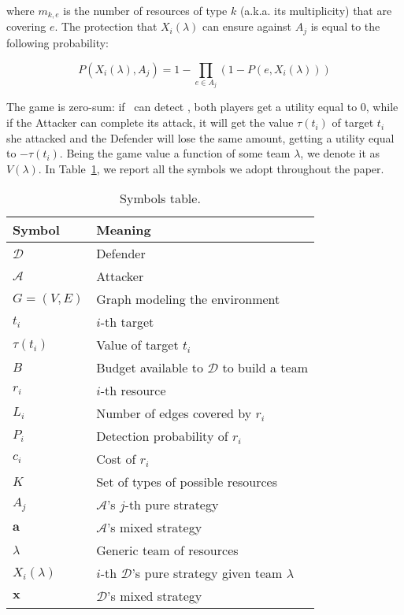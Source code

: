 where $m_{k,e}$ is the number of resources of type $k$ (a.k.a. its multiplicity) that are covering $e$. The protection that $X_i(\lambda)$ can ensure against $A_j$ is equal to the following probability:

\begin{equation*}
P(X_i(\lambda),A_j) = 1 - \prod_{e \in A_j}(1-P(e,X_i(\lambda)))
\end{equation*}

The game is zero-sum: if \Def~can detect \Att, both players get a utility equal to $0$, while if the Attacker can complete its attack, it will get the value $\tau(t_i)$ of target $t_i$ she attacked and the Defender will lose the same amount, getting a utility equal to $-\tau(t_i)$. Being the game value a function of some team $\lambda$, we denote it as $V(\lambda)$. In Table~\ref{tab:symbols}, we report all the symbols we adopt throughout the paper.

\begin{table}[htbp]
    \centering
\begin{tabular}{|l|l|}
	\hline
    Symbol & Meaning \\ \hline
    $\mathcal{D}$ & Defender \\ \hline
    $\mathcal{A}$ & Attacker \\ \hline
    $G = (V,E)$ & Graph modeling the environment\\ \hline
    $t_i$ & $i$-th target \\ \hline
    $\tau(t_i)$ & Value of target $t_i$ \\ \hline \hline
    $B$ & Budget available to $\mathcal{D}$ to build a team \\ \hline
    $r_i$ & $i$-th resource \\ \hline
    $L_i$ & Number of edges covered by $r_i$ \\ \hline
    $P_i$ & Detection probability of $r_i$ \\ \hline
    $c_i$ & Cost of $r_i$ \\ \hline \hline
    $K$ & Set of types of possible resources \\ \hline
    $A_j$ & $\mathcal{A}$'s $j$-th pure strategy \\ \hline
    $\textbf{a}$ & $\mathcal{A}$'s mixed strategy \\ \hline
    $\lambda$ & Generic team of resources \\ \hline
    $X_i(\lambda)$ & $i$-th $\mathcal{D}$'s pure strategy given team $\lambda$\\ \hline
    $\textbf{x}$ & $\mathcal{D}$'s mixed strategy \\ \hline  
\end{tabular}
\caption{Symbols table.}
 \label{tab:symbols}
\end{table}

